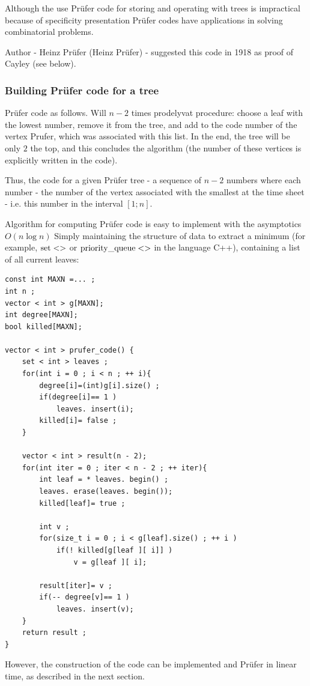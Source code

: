 Although the use Prüfer code for storing and operating with trees is impractical because of specificity presentation Prüfer codes have applications in solving combinatorial problems.

Author - Heinz Prüfer (Heinz Prüfer) - suggested this code in 1918 as proof of Cayley (see below).

\subsubsection{ Building Prüfer code for a tree }

Prüfer code as follows. Will $n-2$ times prodelyvat procedure: choose a leaf with the lowest number, remove it from the tree, and add to the code number of the vertex Prufer, which was associated with this list. In the end, the tree will be only $2$ the top, and this concludes the algorithm (the number of these vertices is explicitly written in the code).

Thus, the code for a given Prüfer tree - a sequence of $n-2$ numbers where each number - the number of the vertex associated with the smallest at the time sheet - i.e. this number in the interval $[1; n]$.

Algorithm for computing Prüfer code is easy to implement with the asymptotics $O (n \log n)$ Simply maintaining the structure of data to extract a minimum (for example, $\rm set <>$ or $\rm priority \_queue <>$ in the language C++), containing a list of all current leaves:

\begin{verbatim}
const int MAXN =... ;
int n ;
vector < int > g[MAXN];
int degree[MAXN];
bool killed[MAXN];
 
vector < int > prufer_code() {
    set < int > leaves ;
    for(int i = 0 ; i < n ; ++ i){
        degree[i]=(int)g[i].size() ;
        if(degree[i]== 1 )
            leaves. insert(i);
        killed[i]= false ;
    }
 
    vector < int > result(n - 2);
    for(int iter = 0 ; iter < n - 2 ; ++ iter){
        int leaf = * leaves. begin() ;
        leaves. erase(leaves. begin());
        killed[leaf]= true ;
 
        int v ;
        for(size_t i = 0 ; i < g[leaf].size() ; ++ i )
            if(! killed[g[leaf ][ i]] )
                v = g[leaf ][ i];
 
        result[iter]= v ;
        if(-- degree[v]== 1 )
            leaves. insert(v);
    }
    return result ;
} 
\end{verbatim}
However, the construction of the code can be implemented and Prüfer in linear time, as described in the next section.

